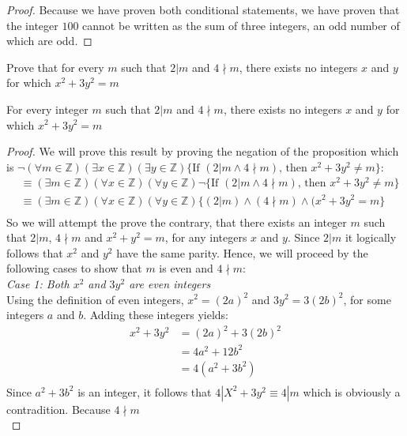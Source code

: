 \begin{example}
\begin{proof}
    Because we have proven both conditional statements, we have proven that the integer $100$ cannot be written as the sum of three integers, an odd number of which are odd. 
\end{proof}
\end{example}

\newpage
\begin{example}
Prove that for every $m$ such that $2 | m$ and $4 \nmid m$, there exists no integers $x$ and $y$ for which $x^2 + 3y^2 = m$
\begin{tcolorbox}
    \begin{theorem}
        For every integer $m$ such that $2 | m$ and $4 \nmid m$, there exists no integers $x$ and $y$ for which $x^2 + 3y^2 = m$
    \end{theorem}
\end{tcolorbox}

\begin{proof}
    We will prove this result by proving the negation of the proposition which is $\neg (\forall m \in \mathbb{Z})(\exists x \in \mathbb{Z})(\exists y \in \mathbb{Z}) \{ \text{If } (2 | m \wedge 4 \nmid m) \text{, then }x^2 + 3y^2 \neq m\}$:
        \begin{align*}
            & \equiv (\exists m \in \mathbb{Z})(\forall x \in \mathbb{Z})(\forall y \in \mathbb{Z}) \neg \{ \text{If } (2 | m \wedge 4 \nmid m) \text{, then }x^2 + 3y^2 \neq m\} \\
            & \equiv (\exists m \in \mathbb{Z})(\forall x \in \mathbb{Z})(\forall y \in \mathbb{Z}) \{ (2 | m) \wedge (4 \nmid m) \wedge (x^2 + 3y^2 = m\} \\ 
        \end{align*}
    So we will attempt the prove the contrary, that there exists an integer $m$ such that $2 | m$, $4 \nmid m$ and $x^2 + y^2 = m$, for any integers $x$ and $y$. Since $2 | m$ it logically follows that $x^2$ and  $y^2$ have the same parity. Hence, we will proceed by the following cases to show that $m$ is even and $4 \nmid m$: \\
   
    \textit{Case 1: Both $x^2$ and $3y^2$ are even integers} \\
        Using the definition of even integers, $x^2 = (2a)^2$ and $3y^2 = 3(2b)^2$, for some integers $a$ and $b$. Adding these integers yields:
            \begin{align*}
                x^2 + 3y^2 & = (2a)^2 + 3(2b)^2 \\
                    & = 4a^2 + 12b^2 \\
                    & = 4(a^2 + 3b^2) \\
            \end{align*}
        Since $a^2 + 3b^2$ is an integer, it follows that $4 | X^2 + 3y^2 \equiv 4 | m$ which is obviously a contradition. Because $4 \nmid m$ \\
    

\end{proof}
\end{example}
